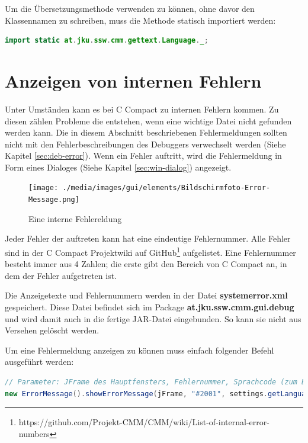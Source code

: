 Um die Übersetzungsmethode verwenden zu können, ohne davor den Klassennamen zu schreiben, muss die Methode statisch importiert werden:
\begin{lstlisting}[language=JAVA]
import static at.jku.ssw.cmm.gettext.Language._;
\end{lstlisting}

\section{Anzeigen von internen Fehlern}
\label{sec:gui-int-error}
Unter Umständen kann es bei C Compact zu internen Fehlern kommen. Zu diesen zählen Probleme die entstehen, wenn eine wichtige Datei nicht gefunden werden kann. Die in diesem Abschnitt beschriebenen Fehlermeldungen sollten nicht mit den Fehlerbeschreibungen des Debuggers verwechselt werden (Siehe Kapitel \ref{sec:deb-error}). Wenn ein Fehler auftritt, wird die Fehlermeldung in Form eines Dialoges (Siehe Kapitel \ref{sec:win-dialog}) angezeigt.

\begin{figure}[htp]
\centering
\texttt{[image: ./media/images/gui/elements/Bildschirmfoto-Error-Message.png]}
\caption{Eine interne Fehlereldung}
\end{figure}

Jeder Fehler der auftreten kann hat eine eindeutige Fehlernummer. Alle Fehler sind in der C Compact Projektwiki auf GitHub\footnote{https://github.com/Projekt-CMM/CMM/wiki/List-of-internal-error-numbers} aufgelistet. Eine Fehlernummer besteht immer aus 4 Zahlen; die erste gibt den Bereich von C Compact an, in dem der Fehler aufgetreten ist.

Die Anzeigetexte und Fehlernummern werden in der Datei \textbf{systemerror.xml} gespeichert. Diese Datei befindet sich im Package \textbf{at.jku.ssw.cmm.gui.debug} und wird damit auch in die fertige JAR-Datei eingebunden. So kann sie nicht aus Versehen gelöscht werden.

Um eine Fehlermeldung anzeigen zu können muss einfach folgender Befehl ausgeführt werden:
\begin{lstlisting}[language=JAVA]
// Parameter: JFrame des Hauptfensters, Fehlernummer, Sprachcode (zum Beispiel "de" oder "en")
new ErrorMessage().showErrorMessage(jFrame, "#2001", settings.getLanguage());
\end{lstlisting}

